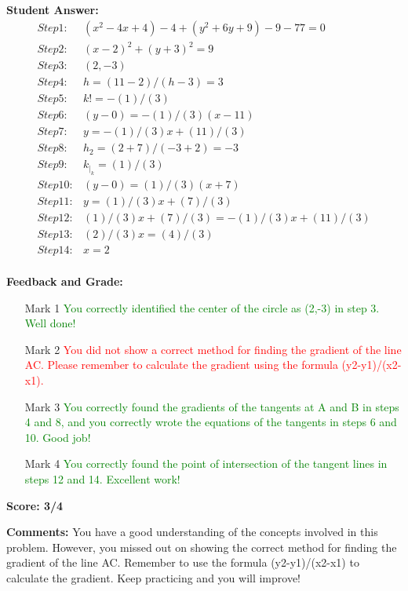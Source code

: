 \documentclass{article}
\begin{document}
\textbf{Student Answer:}
\begin{align*}
Step 1: & (x^{2}-4x+4)-4+(y^{2}+6y+9)-9-77=0 \\
Step 2: & (x-2)^{2}+(y+3)^{2}=9 \\
Step 3: & (2,-3) \\
Step 4: & h=(11-2)/(h-3)=3 \\
Step 5: & k!=-(1)/(3) \\
Step 6: & (y-0)=-(1)/(3)(x-11) \\
Step 7: & y=-(1)/(3)x+(11)/(3) \\
Step 8: & h_2=(2+7)/(-3+2)=-3 \\
Step 9: & k _|_ k=(1)/(3) \\
Step 10: & (y-0)=(1)/(3)(x+7) \\
Step 11: & y=(1)/(3)x+(7)/(3) \\
Step 12: & (1)/(3)x+(7)/(3)=-(1)/(3)x+(11)/(3) \\
Step 13: & (2)/(3)x=(4)/(3) \\
Step 14: & x=2 \\
\end{align*}

\textbf{Feedback and Grade:}
\begin{itemize}
\item[Mark 1] \textcolor{green}{You correctly identified the center of the circle as (2,-3) in step 3. Well done!}
\item[Mark 2] \textcolor{red}{You did not show a correct method for finding the gradient of the line AC. Please remember to calculate the gradient using the formula (y2-y1)/(x2-x1).}
\item[Mark 3] \textcolor{green}{You correctly found the gradients of the tangents at A and B in steps 4 and 8, and you correctly wrote the equations of the tangents in steps 6 and 10. Good job!}
\item[Mark 4] \textcolor{green}{You correctly found the point of intersection of the tangent lines in steps 12 and 14. Excellent work!}
\end{itemize}

\textbf{Score: 3/4}

\textbf{Comments:} You have a good understanding of the concepts involved in this problem. However, you missed out on showing the correct method for finding the gradient of the line AC. Remember to use the formula (y2-y1)/(x2-x1) to calculate the gradient. Keep practicing and you will improve!
\end{document}
